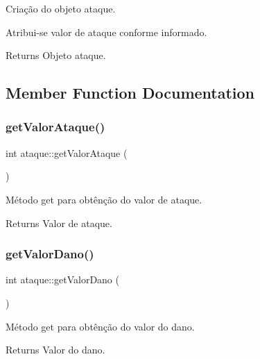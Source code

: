 Criação do objeto ataque. 

Atribui-\/se valor de ataque conforme informado. \begin{DoxyReturn}{Returns}
Objeto ataque. 
\end{DoxyReturn}


\subsection{Member Function Documentation}
\mbox{\label{classataque_ae21cc54ec16f06614dedddb18d861fda}} 
\subsubsection{\texorpdfstring{get\+Valor\+Ataque()}{getValorAtaque()}}
{\footnotesize\ttfamily int ataque\+::get\+Valor\+Ataque (\begin{DoxyParamCaption}{ }\end{DoxyParamCaption})}



Método get para obtênção do valor de ataque. 

\begin{DoxyReturn}{Returns}
Valor de ataque. 
\end{DoxyReturn}
\mbox{\label{classataque_abbd99389ed66a4fdbfe994c3f1a102ec}} 
\subsubsection{\texorpdfstring{get\+Valor\+Dano()}{getValorDano()}}
{\footnotesize\ttfamily int ataque\+::get\+Valor\+Dano (\begin{DoxyParamCaption}{ }\end{DoxyParamCaption})}



Método get para obtênção do valor do dano. 

\begin{DoxyReturn}{Returns}
Valor do dano. 
\end{DoxyReturn}
\mbox{\label{classataque_a431a441a9a11d651dba80b83f6a9a980}} 

